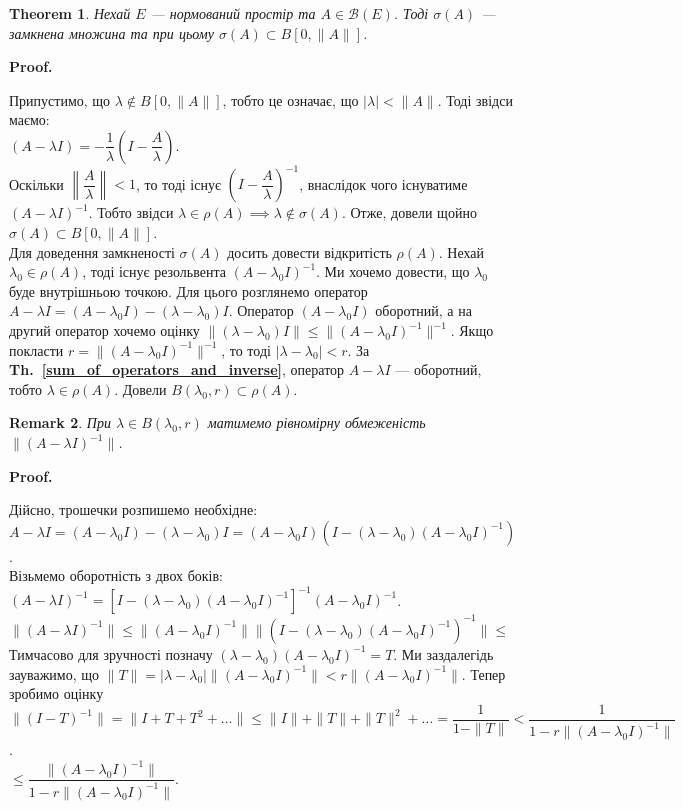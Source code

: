 \documentclass[a4paper, 10pt]{article}
\makeatletter
\theoremstyle{theoremdd}
\newtheorem{theorem}{Theorem}[subsection]
\theoremstyle{theoremdd}
\theoremstyle{theoremdd}
\theoremstyle{theoremdd}
\theoremstyle{theoremdd}
\theoremstyle{theoremdd}
\newtheorem{remark}[theorem]{Remark}
\theoremstyle{theoremdd}
\theoremstyle{theoremdd}
\newcommand\thref[1]{\textbf{Th.~\ref{#1}}}
\renewenvironment{proof}[1][Proof.\\]{\par
\pushQED{\hfill \qed}%
\normalfont \topsep6\p@\@plus6\p@\relax
\trivlist
\item\relax
{\bfseries
#1\@addpunct{.}}\hspace\labelsep\ignorespaces
}{%
\popQED\endtrivlist\@endpefalse
}
\makeatother
\begin{document}
\begin{theorem}
Нехай $E$ --- нормований простір та $A \in \mathcal{B}(E)$. Тоді $\sigma(A)$ --- замкнена множина та при цьому $\sigma(A) \subset B[0, \|A\|]$.
\end{theorem}

\begin{proof}
Припустимо, що $\lambda \notin B[0, \|A\|]$, тобто це означає, що $|\lambda| < \|A\|$. Тоді звідси маємо:\\
$(A-\lambda I) = -\dfrac{1}{\lambda}\left(I - \dfrac{A}{\lambda}\right)$.\\
Оскільки $\left\| \dfrac{A}{\lambda} \right\| < 1$, то тоді існує $\left(I - \dfrac{A}{\lambda}\right)^{-1}$, внаслідок чого існуватиме $(A-\lambda I)^{-1}$. Тобто звідси $\lambda \in \rho(A) \implies \lambda \notin \sigma(A)$. Отже, довели щойно $\sigma(A) \subset B[0, \|A\|]$.\\
Для доведення замкненості $\sigma(A)$ досить довести відкритість $\rho(A)$. Нехай $\lambda_0 \in \rho(A)$, тоді існує резольвента $(A-\lambda_0 I)^{-1}$. Ми хочемо довести, що $\lambda_0$ буде внутрішньою точкою. Для цього розглянемо оператор $A-\lambda I = (A-\lambda_0 I) - (\lambda - \lambda_0)I$. Оператор $(A-\lambda_0 I)$ оборотний, а на другий оператор хочемо оцінку $\| (\lambda - \lambda_0) I\| \leq \| (A-\lambda_0 I)^{-1} \|^{-1}$. Якщо покласти $r = \|(A-\lambda_0 I)^{-1}\|^{-1}$, то тоді $|\lambda-\lambda_0| < r$. За \thref{sum_of_operators_and_inverse}, оператор $A-\lambda I$ --- оборотний, тобто $\lambda \in \rho(A)$. Довели $B(\lambda_0,r) \subset \rho(A)$.
\end{proof}

\begin{remark}
При $\lambda \in B(\lambda_0,r)$ матимемо рівномірну обмеженість $\|(A-\lambda I)^{-1}\|$.
\end{remark}

\begin{proof}
Дійсно, трошечки розпишемо необхідне:\\
$A -\lambda I = (A - \lambda_0 I) - (\lambda - \lambda_0) I = (A-\lambda_0 I) \left(I - (\lambda - \lambda_0)(A -\lambda_0 I)^{-1}\right)$.\\
Візьмемо оборотність з двох боків:\\
$(A - \lambda I)^{-1} = \left[ I - (\lambda - \lambda_0)(A-\lambda_0 I)^{-1}\right]^{-1} (A-\lambda_0 I)^{-1}$.\\
$\|(A-\lambda I)^{-1}\| \leq \| (A-\lambda_0 I)^{-1} \| \| (I- (\lambda - \lambda_0)(A-\lambda_0 I)^{-1})^{-1}\| \boxed{\leq}$\\
Тимчасово для зручності позначу $(\lambda-\lambda_0)(A - \lambda_0 I)^{-1} = T$. Ми заздалегідь зауважимо, що $\|T\| = |\lambda-\lambda_0| \|(A-\lambda_0I)^{-1}\| < r \|(A-\lambda_0 I)^{-1}\|$. Тепер зробимо оцінку\\
$\|(I-T)^{-1}\| = \| I + T + T^2 + \dots \| \leq \|I\| + \|T\| + \|T\|^2 + \dots = \dfrac{1}{1- \|T\|} < \dfrac{1}{1 - r \|(A-\lambda_0 I)^{-1} \|}$.\\
$\boxed{\leq} \dfrac{\|(A-\lambda_0 I)^{-1}\|}{1 - r \|(A-\lambda_0 I)^{-1}\|}$.
\end{proof}
\end{document}
